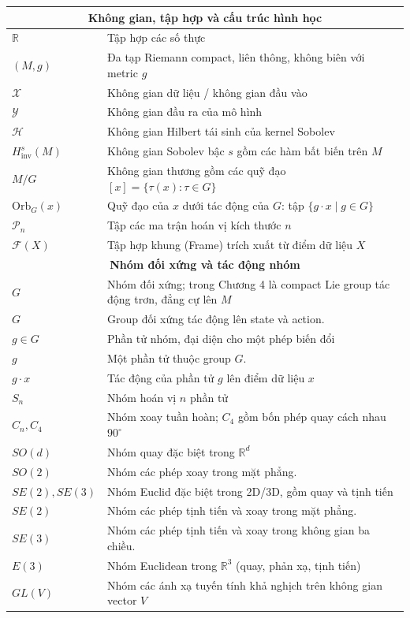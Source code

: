 \documentclass[oneside]{hcmus-report}
\theoremstyle{plain}
\theoremstyle{definition}
\begin{document}
\begin{longtable}{p{} p{}}
\multicolumn{2}{c}{\textbf{Không gian, tập hợp và cấu trúc hình học}} \\
\hline
$\mathbb{R}$ & Tập hợp các số thực \\
$(M, g)$ & Đa tạp Riemann compact, liên thông, không biên với metric $g$ \\
$\mathcal{X}$ & Không gian dữ liệu / không gian đầu vào \\
$\mathcal{Y}$ & Không gian đầu ra của mô hình \\
$\mathcal{H}$ & Không gian Hilbert tái sinh của kernel Sobolev \\
$H^s_{\mathrm{inv}}(M)$ & Không gian Sobolev bậc $s$ gồm các hàm bất biến trên $M$ \\
$M/G$ & Không gian thương gồm các quỹ đạo $[x] = \{\tau(x) : \tau \in G\}$ \\
$\mathrm{Orb}_G(x)$ & Quỹ đạo của $x$ dưới tác động của $G$: tập $\{g \cdot x \mid g \in G\}$ \\
$\mathcal{P}_n$ & Tập các ma trận hoán vị kích thước $n$ \\
$\mathcal{F}(X)$ & Tập hợp khung (Frame) trích xuất từ điểm dữ liệu $X$ \\

\hline

\multicolumn{2}{c}{\textbf{Nhóm đối xứng và tác động nhóm}} \\
\hline
$G$ & Nhóm đối xứng; trong Chương 4 là compact Lie group tác động trơn, đẳng cự lên $M$ \\
$G$ & Group đối xứng tác động lên state và action.\\
$g \in G$ & Phần tử nhóm, đại diện cho một phép biến đổi \\
$g$ & Một phần tử thuộc group $G$.\\
$g \cdot x$ & Tác động của phần tử $g$ lên điểm dữ liệu $x$ \\
$S_n$ & Nhóm hoán vị $n$ phần tử \\
$C_n, C_4$ & Nhóm xoay tuần hoàn; $C_4$ gồm bốn phép quay cách nhau $90^\circ$ \\
$SO(d)$ & Nhóm quay đặc biệt trong $\mathbb{R}^d$ \\
$SO(2)$ & Nhóm các phép xoay trong mặt phẳng.\\
$SE(2), SE(3)$ & Nhóm Euclid đặc biệt trong 2D/3D, gồm quay và tịnh tiến \\
$SE(2)$ & Nhóm các phép tịnh tiến và xoay trong mặt phẳng.\\
$SE(3)$ & Nhóm các phép tịnh tiến và xoay trong không gian ba chiều.\\
$E(3)$ & Nhóm Euclidean trong $\mathbb{R}^3$ (quay, phản xạ, tịnh tiến) \\
$GL(V)$ & Nhóm các ánh xạ tuyến tính khả nghịch trên không gian vector $V$ \\


\end{longtable}
\end{document}
